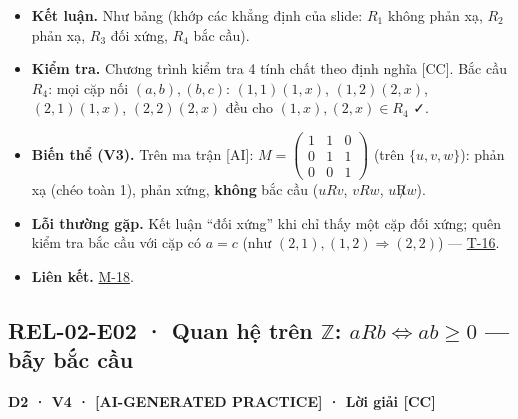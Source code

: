 \documentclass[
  10pt,
  twoside,openany]{book}
\providecommand{\tightlist}{%
  \setlength{\itemsep}{0pt}\setlength{\parskip}{0pt}}
\begin{document}
\begin{itemize}
\tightlist
\item
  \textbf{Kết luận.} Như bảng (khớp các khẳng định của slide: \(R_1\)
  không phản xạ, \(R_2\) phản xạ, \(R_3\) đối xứng, \(R_4\) bắc cầu).
\item
  \textbf{Kiểm tra.} Chương trình kiểm tra 4 tính chất theo định nghĩa
  {[}CC{]}. Bắc cầu \(R_4\): mọi cặp nối \((a,b),(b,c)\):
  \((1,1)(1,x)\), \((1,2)(2,x)\), \((2,1)(1,x)\), \((2,2)(2,x)\) đều cho
  \((1,x),(2,x)\in R_4\) ✓.
\item
  \textbf{Biến thể (V3).} Trên ma trận {[}AI{]}:
  \(M=\begin{pmatrix}1&1&0\\0&1&1\\0&0&1\end{pmatrix}\) (trên
  \(\{u,v,w\}\)): phản xạ (chéo toàn 1), phản xứng, \textbf{không} bắc
  cầu (\(uRv\), \(vRw\), \(u\not R w\)).
\item
  \textbf{Lỗi thường gặp.} Kết luận ``đối xứng'' khi chỉ thấy một cặp
  đối xứng; quên kiểm tra bắc cầu với cặp có \(a=c\) (như
  \((2,1),(1,2)\Rightarrow(2,2)\)) --- \protect\hyperlink{T-16}{T-16}.
\item
  \textbf{Liên kết.} \protect\hyperlink{M-18}{M-18}.
\end{itemize}

\hypertarget{REL-02-E02}{%
\subsection{\texorpdfstring{REL-02-E02 · Quan hệ trên \(\mathbb Z\):
\(aRb\Leftrightarrow ab\ge0\) --- bẫy bắc
cầu}{REL-02-E02 · Quan hệ trên \textbackslash mathbb Z: aRb\textbackslash Leftrightarrow ab\textbackslash ge0 --- bẫy bắc cầu}}\label{REL-02-E02}}

\textbf{D2 · V4 · {[}AI-GENERATED PRACTICE{]} · Lời giải {[}CC{]}}
\end{document}
